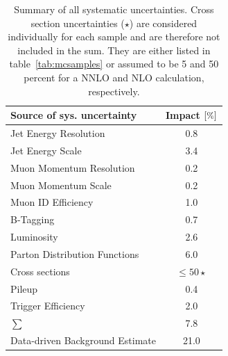 \begin{table}[!htb]
  \centering
  \begin{tabular}{|l|c|}
    \hline
    Source of sys. uncertainty      & Impact $[\pct]$ \\
    \hline
    \hline
    Jet Energy Resolution           & 0.8             \\
    Jet Energy Scale                & 3.4             \\
    Muon Momentum Resolution          & 0.2             \\
    Muon Momentum Scale               & 0.2             \\
    Muon ID Efficiency              & 1.0             \\
    B-Tagging                       & 0.7             \\
    \hline
    Luminosity                      & 2.6             \\
    Parton Distribution Functions   & 6.0             \\
    Cross sections                  & $\leq 50 \star$ \\
    Pileup                          & 0.4             \\
    Trigger Efficiency              & 2.0             \\
    \hline
    $\sum$                          & 7.8             \\
    \hline
    \hline
    Data-driven Background Estimate & 21.0            \\
    \hline
  \end{tabular}
  \caption{Summary of all systematic uncertainties. Cross section uncertainties ($\star$) are considered individually for each sample and are therefore not included in the sum. They are either listed in table~\ref{tab:mcsamples} or assumed to be 5 and 50 percent for a NNLO and NLO calculation, respectively.}
  \label{tab:sys-uncertainties}
\end{table}

